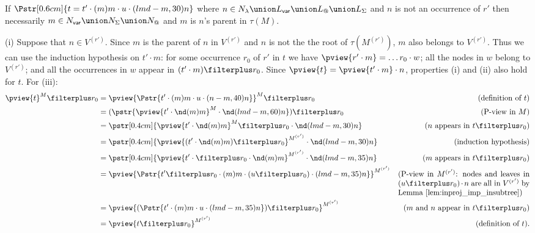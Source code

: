\begin{compactitem}


    \item If $\Pstr[0.6cm]{ t =  t' \cdot (m){m} \cdot u \cdot (lmd-m,30){n} }$
    where $n \in N_\lambda \union L_{\sf var} \union L_@ \union
    L_\Sigma$ and $n$ is not an occurrence of $r'$ then necessarily $m\in N_{\sf var} \union
    N_\Sigma \union N_@$ and $m$ is $n$'s parent in $\tau(M)$.

    (i) Suppose that $n\in V^{(r')}$. Since $m$ is the parent of
    $n$ in $V^{(r')}$ and $n$ is not the the root of
    $\tau(M^{(r')})$, $m$ also belongs to
    $V^{(r')}$. Thus we can use the induction hypothesis on $t' \cdot m$: for some occurrence $r_0$
     of $r'$ in $t$ we have
    $\pview{r' \cdot m} = \ldots r_0 \cdot w$; all the
    nodes in $w$ belong to $V^{(r')}$; and all the
    occurrences in $w$ appear in $(t'\cdot m)\filterplus r_0$.
    Since $\pview{t}= \pview{t' \cdot m} \cdot n$, properties (i) and (ii) also hold for $t$.
    For (iii):
            \begin{align*}
            \pview{t}^M \filterplus r_0 &= \pview{\Pstr{t' \cdot (m){m} \cdot u \cdot (n-m,40){n}}}^M \filterplus r_0
                & (\mbox{definition of } t)\\
            &= (\pstr{\pview{t' \cdot \nd(m){m} }^M \cdot \nd(lmd-m,60){n}}) \filterplus r_0
                & (\mbox{P-view in $M$}) \\
            &= \pstr[0.4cm]{ \pview{t' \cdot \nd(m){m} }^M \filterplus r_0  \cdot \nd(lmd-m,30){n} }
                & (\mbox{$n$ appears in $t\filterplus r_0$}) \\
            &= \pstr[0.4cm]{ \pview{(t' \cdot \nd(m){m})\filterplus r_0}^{M^{(r')}}  \cdot  \nd(lmd-m,30){n} }
                & \mbox{(induction hypothesis)} \\
            &= \pstr[0.4cm]{ \pview{t' \cdot \filterplus r_0 \cdot \nd(m){m}}^{M^{(r')}}  \cdot  \nd(lmd-m,35){n} }
                & \mbox{($m$ appears in $t\filterplus r_0$)} \\
            &= \pview{ \Pstr{t' \filterplus r_0 \cdot (m){m} \cdot {(u \filterplus r_0)} \cdot (lmd-m,35){n}}}^{M^{(r')}}
                & \parbox[t]{6cm}{(P-view in $M^{(r')}$: nodes and leaves in $(u \filterplus r_0) \cdot n$ are all in $V^{(r')}$
                    by Lemma \ref{lem:inproj_imp_insubtree})} \\
            &= \pview{ (\Pstr{t' \cdot (m){m} \cdot u \cdot (lmd-m,35){n}}) \filterplus r_0 }^{M^{(r')}}
                & (\mbox{$m$ and $n$ appear in $t\filterplus r_0$}) \\
            &= \pview{ t \filterplus r_0 }^{M^{(r')}}
                & \mbox{(definition of $t$).}
            \end{align*}


\end{compactitem}
